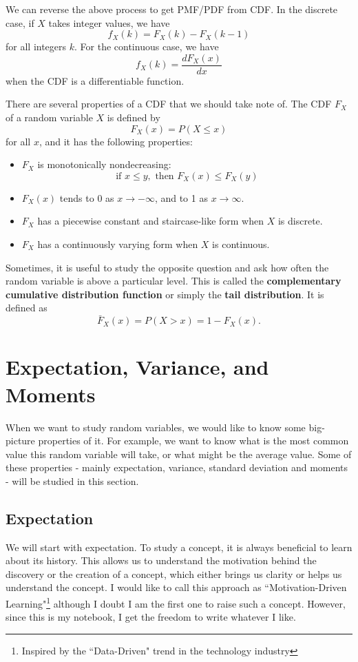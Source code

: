 \documentclass[11pt, a4paper, oneside]{book}
\theoremstyle{definition}
\begin{document}
\noindent We can reverse the above process to get PMF/PDF from CDF. In the discrete case, if $X$ takes integer values, we have\[
f_X(k) = F_X(k) - F_X(k-1)
\]
for all integers $k$. For the continuous case, we have\[
f_X(k) = \frac{dF_X(x)}{dx}
\]
when the CDF is a differentiable function. 

\noindent There are several properties of a CDF that we should take note of. The CDF $F_X$ of a random variable $X$ is defined by\[
F_X(x) = P(X \le x)
\]
for all $x$, and it has the following properties:
\begin{itemize}
\item $F_X$ is monotonically nondecreasing:\[
\text{if } x\le y, \text{ then } F_X(x) \le F_X(y)
\]
\item $F_X(x)$ tends to 0 as $x \to -\infty$, and to 1 as $x \to \infty$. 
\item $F_X$ has a piecewise constant and staircase-like form when $X$ is discrete.
\item $F_X$ has a continuously varying form when $X$ is continuous.
\end{itemize}

\noindent Sometimes, it is useful to study the opposite question and ask how often the random variable is above a particular level. This is called the \textbf{complementary cumulative distribution function} or simply the \textbf{tail distribution}. It is defined as\[
\bar{F}_X(x) = P(X > x) = 1 - F_X(x).
\]

\section{Expectation, Variance, and Moments}

\noindent When we want to study random variables, we would like to know some big-picture properties of it. For example, we want to know what is the most common value this random variable will take, or what might be the average value. Some of these properties - mainly expectation, variance, standard deviation and moments - will be studied in this section.

\subsection{Expectation}

\noindent We will start with expectation. To study a concept, it is always beneficial to learn about its history. This allows us to understand the motivation behind the discovery or the creation of a concept, which either brings us clarity or helps us understand the concept. I would like to call this approach as ``Motivation-Driven Learning"\footnote{Inspired by the ``Data-Driven" trend in the technology industry} although I doubt I am the first one to raise such a concept. However, since this is my notebook, I get the freedom to write whatever I like. 
\end{document}
